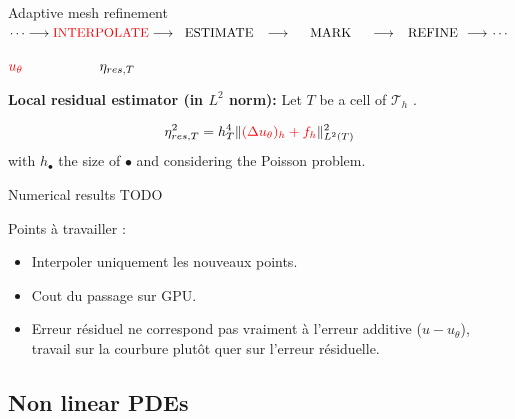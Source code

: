 \begin{frame}[noframenumbering]{Adaptive mesh refinement}
    \vspace{-10pt}
    $\cdots\longrightarrow
    \textcolor{red}{\text{INTERPOLATE}}\longrightarrow\hspace{6pt}
    \text{ESTIMATE}\hspace{8pt}\longrightarrow\hspace{14pt}
    \text{MARK}\hspace{14pt}\longrightarrow\hspace{8pt}
    \text{REFINE}\hspace{4pt}\longrightarrow\hspace{1pt}
    \cdots$

    \hspace{55pt}$\textcolor{red}{u_\theta}\hspace{55pt}\eta_{res,T}$

    \vspace{8pt}
    \textbf{Local residual estimator (in $L^2$ norm):} Let $T$ be a cell of $\mathcal{T}_h$ .

    \vspace{-8pt}
    $$\eta_{res,T}^2 = h_T^4 \|\textcolor{red}{(\Delta u_\theta)_h + f_h}\|_{L^2(T)}^2$$
    with $h_\bullet$ the size of $\bullet$ and considering the Poisson problem.
\end{frame}

\begin{frame}{Numerical results}	
    TODO

    Points à travailler :
    \begin{itemize}
        \item Interpoler uniquement les nouveaux points.
        \item Cout du passage sur GPU.
        \item Erreur résiduel ne correspond pas vraiment à l'erreur additive ($u-u_\theta$), travail sur la courbure plutôt quer sur l'erreur résiduelle.
    \end{itemize}

\end{frame}

\subsection{\filledstar Non linear PDEs}